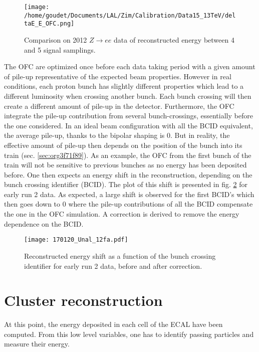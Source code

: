 \begin{figure}[htbp]
\centering
\texttt{[image: /home/goudet/Documents/LAL/Zim/Calibration/Data15\_13TeV/deltaE\_E\_OFC.png]}
\caption{\label{fig:org3364702}
Comparison on 2012 $Z\rightarrow ee$ data of reconstructed energy between 4 and 5 signal samplings. \cite{GuillaumeUnal}}
\end{figure}


The OFC are optimized once before each data taking period with a given amount of pile-up representative of the expected beam properties.
However in real conditions, each proton bunch has slightly different properties which lead to a different luminosity when crossing another bunch.
Each bunch crossing will then create a different amount of pile-up in the detector.
Furthermore, the OFC integrate the pile-up contribution from several bunch-crossings, essentially before the one considered.
In an ideal beam configuration with all the BCID equivalent, the average pile-up, thanks to the bipolar shaping is 0.
But in reality, the effective amount of pile-up then depends on the position of the bunch into its train (sec. \ref{sec:org3f71f89}).
As an example, the OFC from the first bunch of the train will not be sensitive to previous bunches as no energy has been deposited before.
One then expects an energy shift in the reconstruction, depending on the bunch crossing identifier (BCID).
The plot of this shift is presented in fig. \ref{fig:org5f4cc56} for early run 2 data.
As expected, a large shift is observed for the first BCID's which then goes down to 0 where the pile-up contributions of all the BCID compensate the one in the OFC simulation.
A correction is derived to remove the energy dependence on the BCID.

\begin{figure}[htbp]
\centering
\texttt{[image: 170120\_Unal\_12fa.pdf]}
\caption{\label{fig:org5f4cc56}
Reconstructed energy shift as a function of the bunch crossing identifier for early run 2 data, before and after correction. \cite{GuillaumeUnal}}
\end{figure}



\section{Cluster reconstruction}
\label{sec:org78551d8}

At this point, the energy deposited in each cell of the ECAL have been computed.
From this low level variables, one has to identify passing particles and measure their energy.

